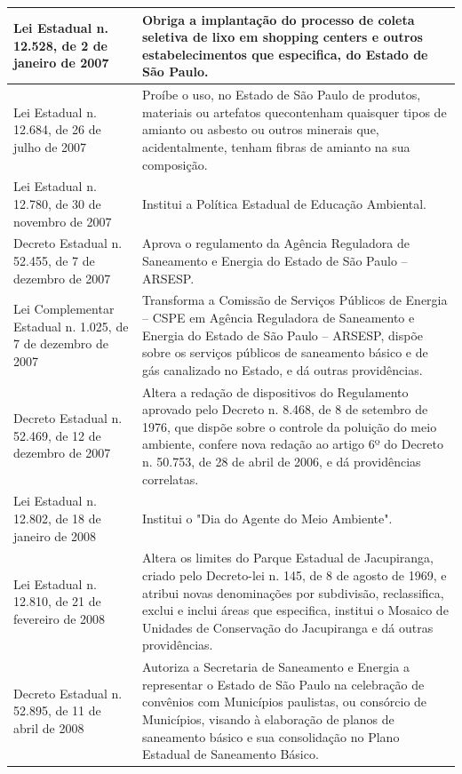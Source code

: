 \begin{center}
\begin{longtable}{|p{}|p{}|}
			\hline
			Lei Estadual n. 12.528, de 2 de janeiro de 2007 & Obriga  a  implantação  do  processo  de  coleta  seletiva  de  lixo  em  shopping centers e outros estabelecimentos que especifica, do Estado de São Paulo. \\
			\hline
			Lei  Estadual  n.  12.684,  de  26 de julho de 2007 & Proíbe o uso, no Estado de São Paulo de produtos, materiais ou artefatos que\newline{}contenham  quaisquer  tipos  de  amianto  ou  asbesto  ou  outros  minerais  que, acidentalmente, tenham fibras de amianto na sua composição. \\
			\hline
			Lei  Estadual  n.  12.780,  de  30 de novembro de 2007 & Institui a Política Estadual de Educação Ambiental. \\
			\hline
			Decreto Estadual n. 52.455, de 7 de dezembro de 2007 & Aprova  o  regulamento  da  Agência  Reguladora  de  Saneamento  e  Energia  do Estado de São Paulo – ARSESP. \\
			\hline
			Lei Complementar Estadual n. 1.025,  de  7  de  dezembro  de 2007 & Transforma a Comissão de Serviços Públicos de Energia  – CSPE em Agência Reguladora  de  Saneamento  e  Energia  do  Estado  de  São  Paulo  –  ARSESP, dispõe sobre os serviços públicos de saneamento básico e de gás canalizado no Estado, e dá outras providências. \\
			\hline
			Decreto Estadual n. 52.469, de 12 de dezembro de 2007 & Altera  a  redação  de  dispositivos  do  Regulamento  aprovado  pelo  Decreto  n. 8.468, de 8 de setembro de 1976, que dispõe sobre o controle da poluição do meio ambiente, confere nova redação ao artigo 6º do Decreto n. 50.753, de 28 de abril de 2006, e dá providências correlatas. \\
			\hline
			Lei  Estadual  n.  12.802,  de  18 de janeiro de 2008 & Institui o "Dia do Agente do Meio Ambiente". \\
			\hline
			Lei  Estadual  n.  12.810,  de  21 de fevereiro de 2008 & Altera os limites do Parque Estadual de Jacupiranga, criado pelo Decreto-lei n. 145,  de  8  de  agosto  de  1969,  e  atribui  novas  denominações  por  subdivisão, reclassifica, exclui e inclui áreas que especifica, institui o Mosaico de Unidades de Conservação do Jacupiranga e dá outras providências. \\
			\hline
			Decreto Estadual n. 52.895, de 11 de abril de 2008 & Autoriza a Secretaria de Saneamento e Energia a representar o Estado de São Paulo  na  celebração  de  convênios  com  Municípios  paulistas,  ou  consórcio  de Municípios,  visando  à  elaboração  de  planos  de  saneamento  básico  e  sua consolidação no Plano Estadual de Saneamento Básico. \\

\end{longtable}
\end{center}
